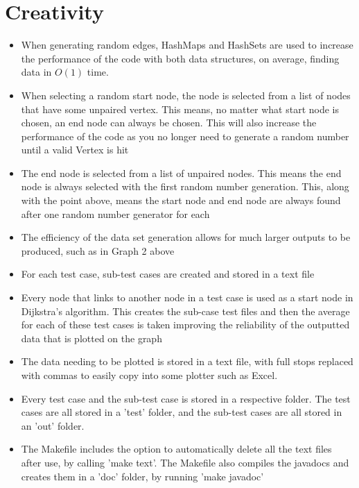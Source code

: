 \documentclass{assignment}
\begin{document}
\section{Creativity}
\begin{itemize}
    \item When generating random edges, HashMaps and HashSets are used to increase the performance of the code with both data structures, on average, finding data in $O(1)$ time.
    \item When selecting a random start node, the node is selected from a list of nodes that have some unpaired vertex. This means, no matter what start node is chosen, an end node can always be chosen. This will also increase the performance of the code as you no longer need to generate a random number until a valid Vertex is hit
    \item The end node is selected from a list of unpaired nodes. This means the end node is always selected with the first random number generation. This, along with the point above, means the start node and end node are always found after one random number generator for each
    \item The efficiency of the data set generation allows for much larger outputs to be produced, such as in Graph 2 above
    \item For each test case, sub-test cases are created and stored in a text file
    \item Every node that links to another node in a test case is used as a start node in Dijkstra's algorithm. This creates the sub-case test files and then the average for each of these test cases is taken improving the reliability of the outputted data that is plotted on the graph
    \item The data needing to be plotted is stored in a text file, with full stops replaced with commas to easily copy into some plotter such as Excel. 
    \item Every test case and the sub-test case is stored in a respective folder. The test cases are all stored in a 'test' folder, and the sub-test cases are all stored in an 'out' folder.
    \item The Makefile includes the option to automatically delete all the text files after use, by calling 'make text'. The Makefile also compiles the javadocs and creates them in a 'doc' folder, by running 'make javadoc'
\end{itemize}
\end{document}
